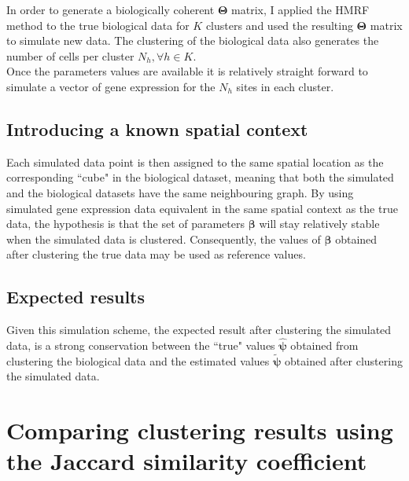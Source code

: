 	In order to generate a biologically coherent $\boldsymbol{\Theta}$ matrix, I applied the HMRF method to the true biological data for $K$ clusters and used the resulting $\boldsymbol{\Theta}$ matrix to simulate new data. The clustering of the biological data also generates the number of cells per cluster $N_h, \forall h \in K$.\\
	
	Once the parameters values are available it is relatively straight forward to simulate a vector of gene expression for the $N_h$ sites in each cluster.
	\subsection{Introducing a known spatial context}\label{subsec:simul_spatial}
	Each simulated data point is then assigned to the same spatial location as the corresponding ``cube" in the biological dataset, meaning that both the simulated and the biological datasets have the same neighbouring graph. By using simulated gene expression data equivalent in the same spatial context as the true data, the hypothesis is that the set of parameters $\boldsymbol{\beta}$ will stay relatively stable when the simulated data is clustered. Consequently, the values of $\boldsymbol{\beta}$ obtained after clustering the true data may be used as reference values.
	\subsection{Expected results}\label{subsec:expected_simul_results}
	Given this simulation scheme, the expected result after clustering the simulated data, is a strong conservation between the ``true" values $\hat{\boldsymbol{\psi}}$ obtained from clustering the biological data and the estimated values $\widetilde{\boldsymbol{\psi}}$ obtained after clustering the simulated data.\\

\section{Comparing clustering results using the Jaccard similarity coefficient}
